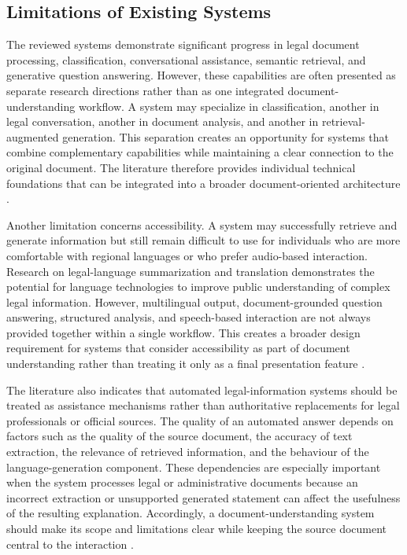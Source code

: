 \documentclass[12pt,a4paper,oneside]{report}
\begin{document}
\subsection{Limitations of Existing Systems}

The reviewed systems demonstrate significant progress in legal document
processing, classification, conversational assistance, semantic retrieval,
and generative question answering. However, these capabilities are often
presented as separate research directions rather than as one integrated
document-understanding workflow. A system may specialize in classification,
another in legal conversation, another in document analysis, and another in
retrieval-augmented generation. This separation creates an opportunity for
systems that combine complementary capabilities while maintaining a clear
connection to the original document. The literature therefore provides
individual technical foundations that can be integrated into a broader
document-oriented architecture
\cite{mahoney2019,kandula2023,jurisai2025}.

Another limitation concerns accessibility. A system may successfully retrieve
and generate information but still remain difficult to use for individuals
who are more comfortable with regional languages or who prefer audio-based
interaction. Research on legal-language summarization and translation
demonstrates the potential for language technologies to improve public
understanding of complex legal information. However, multilingual output,
document-grounded question answering, structured analysis, and speech-based
interaction are not always provided together within a single workflow. This
creates a broader design requirement for systems that consider accessibility
as part of document understanding rather than treating it only as a final
presentation feature
\cite{ash2024translating}.

The literature also indicates that automated legal-information systems should
be treated as assistance mechanisms rather than authoritative replacements
for legal professionals or official sources. The quality of an automated
answer depends on factors such as the quality of the source document, the
accuracy of text extraction, the relevance of retrieved information, and the
behaviour of the language-generation component. These dependencies are
especially important when the system processes legal or administrative
documents because an incorrect extraction or unsupported generated statement
can affect the usefulness of the resulting explanation. Accordingly, a
document-understanding system should make its scope and limitations clear
while keeping the source document central to the interaction
\cite{lewis2020rag,es2024ragas}.
\end{document}
